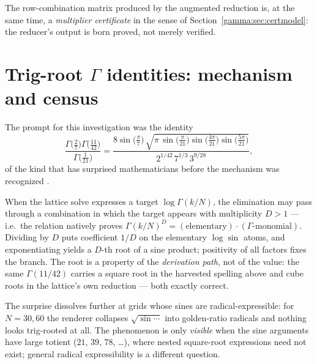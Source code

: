 \begin{remark}
The row-combination matrix produced by the augmented reduction is, at the same time, a
\emph{multiplier certificate} in the sense of Section~\ref{gamma:sec:certmodel}: the reducer's
output is born proved, not merely verified.
\end{remark}

\section{Trig-root \texorpdfstring{$\Gamma$}{Gamma} identities: mechanism and census}
\label{gamma:sec:trigroot}

The prompt for this investigation was the identity
\[
\frac{\Gamma\bigl(\tfrac27\bigr)\Gamma\bigl(\tfrac{11}{42}\bigr)}{\Gamma\bigl(\tfrac1{21}\bigr)}
=\frac{8\sin\bigl(\tfrac{\pi}{7}\bigr)\,
\sqrt{\pi\,\sin\bigl(\tfrac{\pi}{21}\bigr)\sin\bigl(\tfrac{4\pi}{21}\bigr)
\sin\bigl(\tfrac{5\pi}{21}\bigr)}}
{2^{1/42}\,7^{1/3}\,3^{9/28}},
\]
of the kind that has surprised mathematicians before the mechanism was recognized
.

\begin{result}\label{gamma:res:trigmech}
When the lattice solve expresses a target $\log\Gamma(k/N)$, the elimination may pass
through a combination in which the target appears with multiplicity $D>1$ --- i.e.\ the
relation natively proves $\Gamma(k/N)^D=(\text{elementary})\cdot(\Gamma\text{-monomial})$.
Dividing by $D$ puts coefficient $1/D$ on the elementary $\log\sin$ atoms, and
exponentiating yields a $D$-th root of a sine product; positivity of all factors fixes the
branch. The root is a property of the \emph{derivation path}, not of the value: the same
$\Gamma(11/42)$ carries a square root in the harvested spelling above and cube roots in
the lattice's own reduction --- both exactly correct.
\end{result}

The surprise dissolves further at grids whose sines are radical-expressible: for
$N=30,60$ the renderer collapses $\sqrt{\sin\cdots}$ into golden-ratio radicals and
nothing looks trig-rooted at all. The phenomenon is only \emph{visible} when the sine
arguments have large totient ($21$, $39$, $78$, \dots), where nested square-root expressions need not exist; general radical expressibility is a different question.

